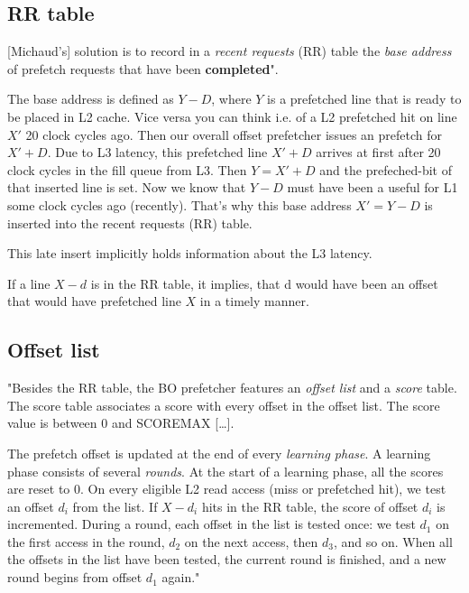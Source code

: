 \documentclass[conference]{IEEEtran}
\begin{document}
\subsection{RR table}

[Michaud's] solution is to record in a \textit{recent requests} (RR) table
the \textit{base address} of prefetch requests that have been \textbf{completed}"\cite{BOP_2016}.

The base address is defined as $Y - D$, where $Y$ is a prefetched line that is ready to be placed in L2 cache.
Vice versa you can think i.e. of a L2 prefetched hit on line $X'$ 20 clock cycles ago.
Then our overall offset prefetcher issues an prefetch for $X' + D$.
Due to L3 latency, this prefetched line $X' + D$ arrives at first after 20 clock cycles in the fill queue from L3.
Then $Y = X' + D$ and the prefeched-bit of that inserted line is set.
Now we know that $Y - D$ must have been a useful for L1 some clock cycles ago (recently).
That's why this base address $X' = Y - D$ is inserted into the recent requests (RR) table.

This late insert implicitly holds information about the L3 latency.

If a line $X - d$ is in the RR table, it implies,
that d would have been an offset that would have prefetched line $X$ in a timely manner.

\subsection{Offset list}

"Besides the RR table, the BO prefetcher features an \textit{offset list} and
a \textit{score} table. The score table associates a score with
every offset in the offset list. The score value is between 0
and SCOREMAX [\dots].

The prefetch offset is updated at the end of every \textit{learning phase}.
A learning phase consists of several \textit{rounds}. At the
start of a learning phase, all the scores are reset to 0.
On every eligible L2 read access (miss or prefetched hit), we test
an offset $d_i$ from the list. If $X - d_i$ hits in the RR table, the
score of offset $d_i$ is incremented.
During a round, each offset in the list is tested once:
we test $d_1$ on the first access in the round,
$d_2$ on the next access, then $d_3$, and so on.
When all the offsets in the list have been tested, the current round is
finished, and a new round begins from offset $d_1$ again."\cite{BOP_2016}
\end{document}
